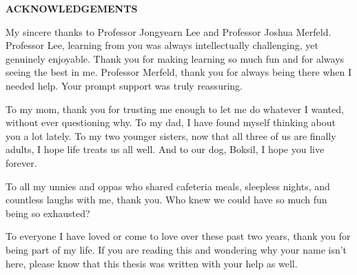 \vspace*{55pt}
{\centering\textbf{ACKNOWLEDGEMENTS}\par}
\vspace{34.5pt}

My sincere thanks to Professor Jongyearn Lee and Professor Joshua Merfeld. Professor Lee, learning from you was always intellectually challenging, yet genuinely enjoyable. Thank you for making learning so much fun and for always seeing the best in me. Professor Merfeld, thank you for always being there when I needed help. Your prompt support was truly reassuring.

To my mom, thank you for trusting me enough to let me do whatever I wanted, without ever questioning why. To my dad, I have found myself thinking about you a lot lately. To my two younger sisters, now that all three of us are finally adults, I hope life treats us all well. And to our dog, Boksil, I hope you live forever.

To all my unnies and oppas who shared cafeteria meals, sleepless nights, and countless laughs with me, thank you. Who knew we could have so much fun being so exhausted?

To everyone I have loved or come to love over these past two years, thank you for being part of my life. If you are reading this and wondering why your name isn't here, please know that this thesis was written with your help as well.
\clearpage
